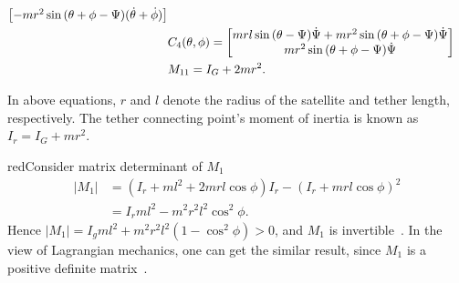 \begin{align}
\begin{bmatrix}
-mr^2\sin{(\theta+\phi-\Psi)}(\dot\theta+\dot\phi)
\end{bmatrix}\notag\\
&C_4(\theta,\phi)   =
\begin{bmatrix}
mrl\sin{(\theta-\Psi)}\dot\Psi+mr^2\sin{(\theta+\phi-\Psi)}\dot\Psi\\
mr^2\sin{(\theta+\phi-\Psi)}\dot\Psi
\end{bmatrix}\notag\\
&M_{11}=I_G+2mr^2.\notag
\end{align}\par
In above equations, $r$ and $l$ denote the radius of the satellite and tether length, respectively. The tether connecting point's moment of inertia is known as $I_r=I_G+mr^2$. \begin{color}{red}Consider matrix determinant of $M_1$
\begin{align*}
\vert M_1\vert
&= (I_r+ml^2+2mrl\cos{\phi})I_r-(I_r+mrl\cos{\phi})^2\\
&= I_rml^2 - m^2r^2l^2\cos^2{\phi}.
\end{align*}
Hence $\vert M_1\vert = I_gml^2+m^2r^2l^2(1-\cos^2{\phi})>0$, and $M_1$ is invertible~\cite{horn2012matrix}. In the view of Lagrangian mechanics, one can get the similar result, since $M_{1}$ is a positive definite matrix~\cite{ortega2013passivity}.\end{color}

